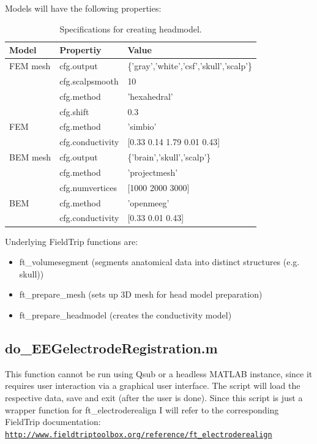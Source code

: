 \documentclass[12pt,a4paper]{scrartcl}
\begin{document}
Models will have the following properties:
\begin{table}[h]
\centering
\begin{tabular}{l | l | l}
\toprule
Model & Propertiy & Value\\\hline
  FEM mesh & cfg.output & \{'gray','white','csf','skull','scalp'\}\\\hline
   & cfg.scalpsmooth & 10\\\hline
   & cfg.method & 'hexahedral'\\\hline
   & cfg.shift & 0.3\\\hline
  FEM & cfg.method & 'simbio'\\\hline
   & cfg.conductivity & [0.33 0.14 1.79 0.01 0.43]\\\midrule
 BEM mesh & cfg.output & \{'brain','skull','scalp'\}\\\hline
  & cfg.method & 'projectmesh'\\\hline
  & cfg.numvertices & [1000 2000 3000]\\\hline
 BEM & cfg.method & 'openmeeg'\\\hline
  & cfg.conductivity & [0.33 0.01 0.43]\\\bottomrule
\end{tabular}
\caption[Specifications for creating headmodel]{Specifications for creating headmodel.}
\label{tab:BEMFEMprop}
\end{table}
Underlying FieldTrip functions are:
\begin{itemize}
\item ft\_volumesegment (segments anatomical data into distinct structures (e.g. skull))
\item ft\_prepare\_mesh (sets up 3D mesh for head model preparation)
\item ft\_prepare\_headmodel (creates the conductivity model)
\end{itemize}

\subsection{do\_EEGelectrodeRegistration.m}
\label{sec:elecReg}
This function cannot be run using Qsub or a headless MATLAB instance, since it requires user interaction via a graphical user interface. The script will load the respective data, save and exit (after the user is done). Since this script is just a wrapper function for ft\_electroderealign I will refer to the corresponding FieldTrip documentation: \href{http://www.fieldtriptoolbox.org/reference/ft\_electroderealign}{\nolinkurl{http://www.fieldtriptoolbox.org/reference/ft\_electroderealign}}
\end{document}
